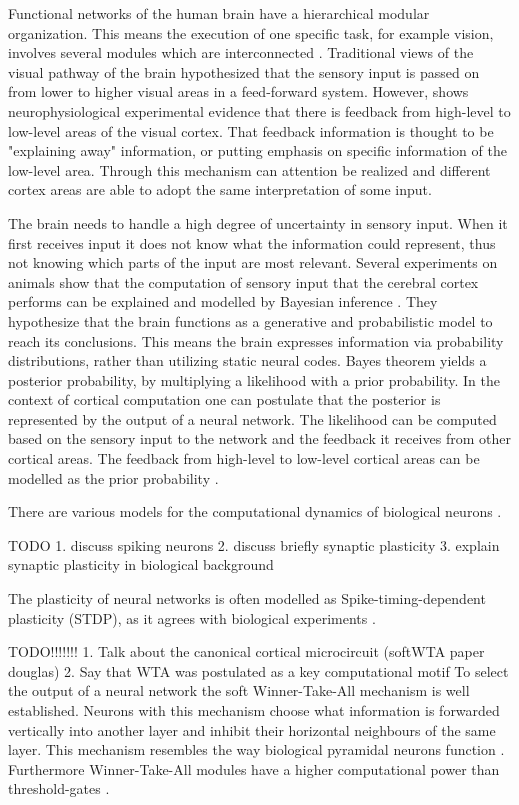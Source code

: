 Functional networks of the human brain have a hierarchical modular organization. This means the execution of one specific task, for example vision, involves several modules which are interconnected  \citep{hierarchicalBrain}. Traditional views of the visual pathway of the brain hypothesized that the sensory input is passed on from lower to higher visual areas in a feed-forward system. However, \citet{HierachicalBayesVisualCortex} shows  neurophysiological experimental evidence that there is feedback from high-level to low-level areas of the visual cortex. That feedback information is thought to be "explaining away" information, or putting emphasis on specific information of the low-level area. Through this mechanism can attention be realized and different cortex areas are able to adopt the same interpretation of some input.
 
The brain needs to handle a high degree of uncertainty in sensory input. When it first receives input it does not know what the information could represent, thus not knowing which parts of the input are most relevant. Several experiments on animals show that the computation of sensory input that the cerebral cortex performs can be explained and modelled by Bayesian inference \citep{neuralSubstrate, HierachicalBayesVisualCortex, anatomyOfInference}. They hypothesize that the brain functions as a generative and probabilistic model to reach its conclusions. This means the brain expresses information via probability distributions, rather than utilizing static neural codes. Bayes theorem yields a posterior probability, by multiplying a likelihood with a prior probability. In the context of cortical computation one can postulate that the posterior is represented by the output of a neural network. The likelihood can be computed based on the sensory input to the network and the feedback it receives from other cortical areas. The feedback from high-level to low-level cortical areas can be modelled as the prior probability \citep{nessler}.

There are various models for the computational dynamics of biological neurons \citep{SpikingNeuronModelsBook}. 

TODO
1. discuss spiking neurons
2. discuss briefly synaptic plasticity
3. explain synaptic plasticity in biological background

The plasticity of neural networks is often modelled as Spike-timing-dependent plasticity (STDP), as it agrees with biological experiments \citep{STDPFELDMAN, STDPDAN}. 

TODO!!!!!!!
1. Talk about the canonical cortical microcircuit (softWTA paper douglas)
2. Say that WTA was postulated as a key computational motif
To select the output of a neural network the soft Winner-Take-All mechanism is well established. Neurons with this mechanism choose what information is forwarded vertically into another layer and inhibit their horizontal neighbours of the same layer.  This mechanism resembles the way biological pyramidal neurons function \citep{softWTA}. Furthermore Winner-Take-All modules have a higher computational power than threshold-gates \citep{WTAPower}.


